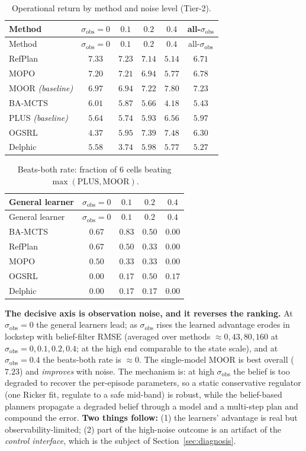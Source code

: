 \documentclass[11pt]{article}
\newcommand{\sobs}{\sigma_{\mathrm{obs}}}
\begin{document}
\begin{longtable}{@{}lccccc@{}}
\caption{Operational return by method and noise level (Tier-2).}\\
\toprule
Method & $\sobs{=}0$ & $0.1$ & $0.2$ & $0.4$ & all-$\sobs$ \\
\midrule
\endfirsthead
\toprule
Method & $\sobs{=}0$ & $0.1$ & $0.2$ & $0.4$ & all-$\sobs$ \\
\midrule
\endhead
RefPlan & $7.33$ & $7.23$ & $7.14$ & $5.14$ & $6.71$ \\
MOPO    & $7.20$ & $7.21$ & $6.94$ & $5.77$ & $6.78$ \\
MOOR \emph{(baseline)} & $6.97$ & $6.94$ & $7.22$ & $\mathbf{7.80}$ & $\mathbf{7.23}$ \\
BA-MCTS & $6.01$ & $5.87$ & $5.66$ & $4.18$ & $5.43$ \\
PLUS \emph{(baseline)} & $5.64$ & $5.74$ & $5.93$ & $6.56$ & $5.97$ \\
OGSRL   & $4.37$ & $5.95$ & $7.39$ & $7.48$ & $6.30$ \\
Delphic & $5.58$ & $3.74$ & $5.98$ & $5.77$ & $5.27$ \\
\bottomrule
\end{longtable}

\begin{longtable}{@{}lcccc@{}}
\caption{Beats-both rate: fraction of $6$ cells beating $\max(\text{PLUS},\text{MOOR})$.}\\
\toprule
General learner & $\sobs{=}0$ & $0.1$ & $0.2$ & $0.4$ \\
\midrule
\endfirsthead
\toprule
General learner & $\sobs{=}0$ & $0.1$ & $0.2$ & $0.4$ \\
\midrule
\endhead
BA-MCTS & $0.67$ & $\mathbf{0.83}$ & $0.50$ & $0.00$ \\
RefPlan & $0.67$ & $0.50$ & $0.33$ & $0.00$ \\
MOPO    & $0.50$ & $0.33$ & $0.33$ & $0.00$ \\
OGSRL   & $0.00$ & $0.17$ & $0.50$ & $0.17$ \\
Delphic & $0.00$ & $0.17$ & $0.17$ & $0.00$ \\
\bottomrule
\end{longtable}

\noindent\textbf{The decisive axis is observation noise, and it reverses the
ranking.} At $\sobs{=}0$ the general learners lead; as $\sobs$ rises the learned
advantage erodes in lockstep with belief-filter RMSE (averaged over methods
$\approx 0,43,80,160$ at $\sobs{=}0,0.1,0.2,0.4$; at the high end comparable to the
state scale), and at $\sobs{=}0.4$ the beats-both rate is $\approx 0$. The
single-model MOOR is best overall ($7.23$) and \emph{improves} with noise. The
mechanism is: at high $\sobs$ the belief is too degraded to recover the per-episode
parameters, so a static conservative regulator (one Ricker fit, regulate to a safe
mid-band) is robust, while the belief-based planners propagate a degraded belief
through a model and a multi-step plan and compound the error. \textbf{Two things
follow:} (1) the learners' advantage is real but observability-limited; (2) part of
the high-noise outcome is an artifact of the \emph{control interface}, which is the
subject of Section~\ref{sec:diagnosis}.
\end{document}
